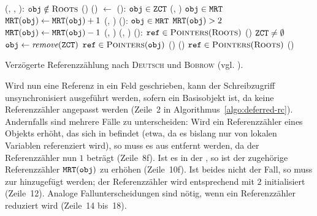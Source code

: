 \begin{algorithm}[h]
\begin{algorithmic}[1]
	\State {}(, , ):
	\State \quad \IF $\texttt{obj} \notin \textsc{Roots}$		
	\State \quad \quad \Atomic
	\State \quad \quad \quad {}()
	\State \quad \quad \quad {}()
	\State \quad {} $\gets$ 
	\Statex
	\State {}():
	\State \quad \IF $\texttt{obj} \in \texttt{ZCT}$
	\State \quad \quad {}(, )	
	\State \quad \ELSE \IF $\texttt{obj} \in \texttt{MRT}$
	\State \quad \quad $\texttt{MRT}(\texttt{obj}) \gets \texttt{MRT}(\texttt{obj}) + 1$	
	\State \quad \ELSE {}(, )		
	\Statex
	\State {}():
	\State \quad \IF $\texttt{obj} \in \texttt{MRT}$
	\State \quad \quad \IF $\texttt{MRT}(\texttt{obj}) > 2$
	\State \quad \quad \quad $\texttt{MRT}(\texttt{obj}) \gets \texttt{MRT}(\texttt{obj}) - 1$	
	\State \quad \quad \ELSE {}(, )	
	\State \quad \ELSE {}(, )			
	\Statex
	\State \Atomic {}():
	\State \quad \FOREACH $\texttt{ref} \in \textsc{Pointers}(\textsc{Roots})$		
	\State \quad \quad {}()
	\State \quad \WHILE $\texttt{ZCT} \neq \emptyset$		
	\State \quad \quad $\texttt{obj} \gets \textit{remove}(\texttt{ZCT})$
	\State \quad \quad \FOREACH $\texttt{ref} \in \textsc{Pointers}(\texttt{obj})$
	\State \quad \quad \quad {}()
	\State \quad \quad {}()
	\State \quad \FOREACH $\texttt{ref} \in \textsc{Pointers}(\textsc{Roots})$		
	\State \quad \quad {}()
\end{algorithmic}
\caption[Verzögerte Referenzzählung nach \textsc{Deutsch} und \textsc{Bobrow}]{Verzögerte Referenzzählung nach \textsc{Deutsch} und \textsc{Bobrow} (vgl. \cite[S. 523f]{deutsch1976}).}
\label{algo:deferred-rc}
\end{algorithm}

Wird nun eine Referenz  in ein Feld  geschrieben, kann der Schreibzugriff unsynchronisiert ausgeführt werden, sofern  ein Basisobjekt ist, da keine Referenzzähler angepasst werden (Zeile~2 in Algorithmus~\ref{algo:deferred-rc}).
Andernfalls sind mehrere Fälle zu unterscheiden:
Wird ein Referenzzähler eines Objekts  erhöht, das sich in  befindet (etwa, da es bislang nur von lokalen Variablen referenziert wird), so muss es aus  entfernt werden, da der Referenzzähler nun $1$ beträgt (Zeile~8f).
Ist es in der , so ist der zugehörige Referenzzähler $\texttt{MRT}(\texttt{obj})$ zu erhöhen (Zeile~10f).
Ist beides nicht der Fall, so muss  zur  hinzugefügt werden; der Referenzzähler wird entsprechend mit $2$ initialisiert (Zeile~12).
Analoge Fallunterscheidungen sind nötig, wenn ein Referenzzähler reduziert wird (Zeile~14 bis~18).

